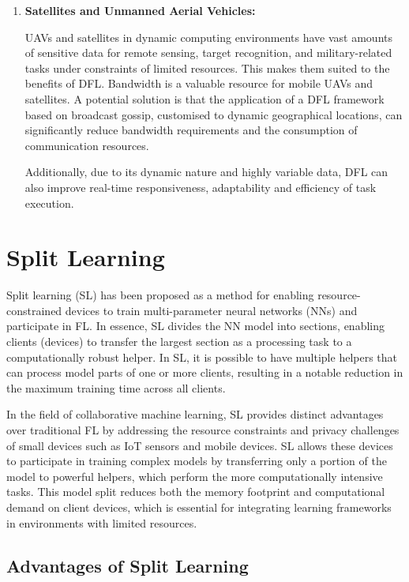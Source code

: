 \begin{enumerate}
	\item \textbf{Satellites and Unmanned Aerial Vehicles:}
	
	UAVs and satellites in dynamic computing environments have vast amounts of sensitive data for remote sensing, target recognition, and military-related tasks under constraints of limited resources. This makes them suited to the benefits of DFL. Bandwidth is a valuable resource for mobile UAVs and satellites. A potential solution is that the application of a \gls{DFL} framework based on broadcast gossip, customised to dynamic geographical locations, can significantly reduce bandwidth requirements and the consumption of communication resources. 
	
	Additionally, due to its dynamic nature and highly variable data, \gls{DFL} can also improve real-time responsiveness, adaptability and efficiency of task execution.

\end{enumerate}


\section{Split Learning}
\label{sec:split_learning}

Split learning (SL) has been proposed as a method for enabling resource-constrained devices to train multi-parameter neural networks (NNs) and participate in \gls{FL}. In essence, \gls{SL} divides the \gls{NN} model into sections, enabling clients (devices) to transfer the largest section as a processing task to a computationally robust helper. In SL, it is possible to have multiple helpers that can process model parts of one or more clients, resulting in a notable reduction in the maximum training time across all clients.

In the field of collaborative machine learning, \gls{SL} provides distinct advantages over traditional \gls{FL} by addressing the resource constraints and privacy challenges of small devices such as IoT sensors and mobile devices. SL allows these devices to participate in training complex models by transferring only a portion of the model to powerful helpers, which perform the more computationally intensive tasks. This model split reduces both the memory footprint and computational demand on client devices, which is essential for integrating learning frameworks in environments with limited resources.

\subsection{Advantages of Split Learning}
\label{sec:advantages_of_sl}


